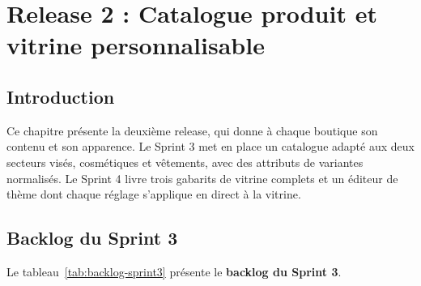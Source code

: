 \thispagestyle{fancy}
\chapter{Release 2 : Catalogue produit et vitrine personnalisable}
\section*{Introduction}
Ce chapitre présente la deuxième release, qui donne à chaque boutique son contenu et son apparence. Le Sprint 3 met en place un catalogue adapté aux deux secteurs visés, cosmétiques et vêtements, avec des attributs de variantes normalisés. Le Sprint 4 livre trois gabarits de vitrine complets et un éditeur de thème dont chaque réglage s'applique en direct à la vitrine.

\section{Backlog du Sprint 3}
Le tableau~\ref{tab:backlog-sprint3} présente le \textbf{backlog du Sprint 3}.

